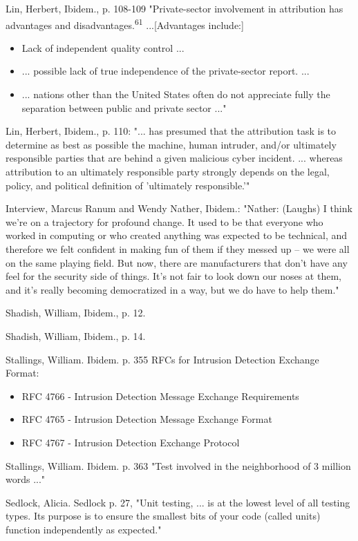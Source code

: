 Lin, Herbert, Ibidem., p. 108-109 "Private-sector involvement in attribution has advantages and disadvantages.\textsuperscript{61} ...[Advantages include:] \begin{itemize} \item Lack of independent quality control ... \item ... possible lack of true independence of the private-sector report. ... \item ... nations other than the United States often do not appreciate fully the separation between public and private sector ..." \end{itemize}

Lin, Herbert, Ibidem., p. 110: "... has presumed that the attribution task is to determine as best as possible the machine, human intruder, and/or ultimately responsible parties that are behind a given malicious cyber incident. ... whereas attribution to an ultimately responsible party strongly depends on the legal, policy, and political definition of 'ultimately responsible.'"

Interview, Marcus Ranum and Wendy Nather, Ibidem.: "Nather: (Laughs) I think we're on a trajectory for profound change. It used to be that everyone who worked in computing or who created anything was expected to be technical, and therefore we felt confident in making fun of them if they messed up -- we were all on the same playing field. But now, there are manufacturers that don't have any feel for the security side of things. It's not fair to look down our noses at them, and it's really becoming democratized in a way, but we do have to help them."

Shadish, William, Ibidem., p. 12.

Shadish, William, Ibidem., p. 14.

Stallings, William. Ibidem. p. 355 RFCs for Intrusion Detection Exchange Format: \begin{itemize} \item RFC 4766 - Intrusion Detection Message Exchange Requirements \item RFC 4765 - Intrusion Detection Message Exchange Format \item RFC 4767 - Intrusion Detection Exchange Protocol \end{itemize}

Stallings, William. Ibidem. p. 363 "Test involved in the neighborhood of 3 million words ..."

Sedlock, Alicia. {Sedlock} p. 27, "Unit testing, ... is at the lowest level of all testing types. Its purpose is to ensure the smallest bits of your code (called units) function independently as expected."

